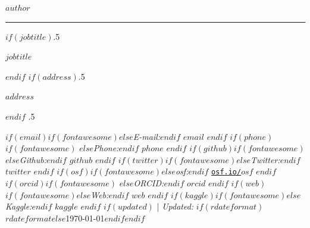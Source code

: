 
\usepackage{datetime}


\usepackage{orcidlink}




\centerline{\huge \bf $author$}

\vspace{2 mm}

\hrule

\vspace{2 mm}

$if(jobtitle)$\moveleft.5\hoffset\centerline{$jobtitle$}$endif$
$if(address)$\moveleft.5\hoffset\centerline{$address$}$endif$
\moveleft.5\hoffset\centerline{ $if(email)$$if(fontawesome)$\faEnvelope \hspace{1 mm}$else$\emph{E-mail:}$endif$ \href{mailto:}{\tt $email$} \hspace{1 mm}$endif$ $if(phone)$$if(fontawesome)$ \faPhone \hspace{1 mm}$else$\emph{Phone:}$endif$  $phone$  \hspace{1 mm} $endif$ $if(github)$$if(fontawesome)$\faGithub \hspace{1 mm}$else$\emph{Github:}$endif$ \href{http://github.com/$github$}{\tt $github$} \hspace{1 mm} $endif$  $if(twitter)$$if(fontawesome)$\faTwitter \hspace{1 mm}$else$\emph{Twitter:}$endif$ \href{https:/twitter.com/$twitter$}{\tt $twitter$} \hspace{1 mm} $endif$ $if(osf)$$if(fontawesome)$\faUnlock \hspace{1 mm}$else$\emph{osf:}$endif$ \href{https:/osf.io/$osf$}{\tt osf.io/$osf$} \hspace{1 mm} $endif$ $if(orcid)$$if(fontawesome)$ \hspace{.5 mm}$else$\emph{ORCID:}$endif$ \href{https://orcid.org/$orcid$}{\tt $orcid$} \hspace{1 mm} $endif$ $if(web)$$if(fontawesome)$\faGlobe \hspace{1 mm}$else$\emph{Web:}$endif$ \href{http://$web$}{\tt $web$}  $endif$ $if(kaggle)$$if(fontawesome)$\faKaggle \hspace{1 mm}$else$\emph{Kaggle:}$endif$ \href{http://kaggle.com/$kaggle$}{\tt $kaggle$} \hspace{1 mm} $endif$   $if(updated)$ | \emph{Updated:} $if(rdateformat)$$rdateformat$$else$\apstylekinda\today$endif$$endif$}



